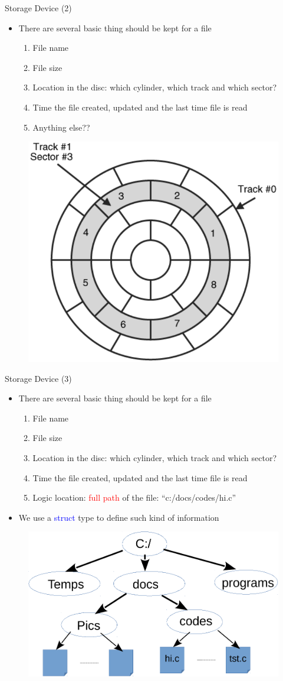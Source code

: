 \begin{frame}{Storage Device (2)}
\begin{itemize}
	\item {There are several basic thing should be kept for a file}
	\begin{enumerate}
		\item {File name}
		\item {File size}
		\item {Location in the disc: which cylinder, which track and which sector?}
		\item {Time the file created, updated and the last time file is read}
		\item {Anything else??}
	\end{enumerate}
\end{itemize}
\begin{figure}
	\includegraphics[width=0.35\linewidth]{figs/disc.pdf}
\end{figure}
\end{frame}

\begin{frame}{Storage Device (3)}
\begin{itemize}
	\item {There are several basic thing should be kept for a file}
	\begin{enumerate}
		\item {File name}
		\item {File size}
		\item {Location in the disc: which cylinder, which track and which sector?}
		\item {Time the file created, updated and the last time file is read}
		\item {Logic location: \textcolor{red}{full path} of the file: ``c:/docs/codes/hi.c''}
	\end{enumerate}
	\item {We use a \textcolor{blue}{struct} type to define such kind of information}
\end{itemize}
\begin{figure}
	\includegraphics[width=0.5\linewidth]{figs/ftree.pdf}
\end{figure}
\end{frame}

